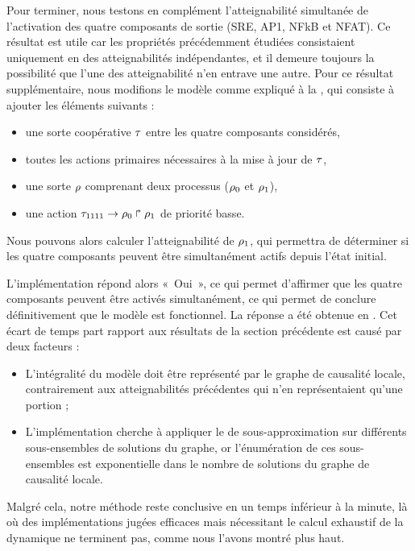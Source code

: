\myskip

Pour terminer, nous testons en complément l'atteignabilité simultanée
de l'activation des quatre composants de sortie (SRE, AP1, NFkB et NFAT).
Ce résultat est utile car les propriétés précédemment étudiées consistaient uniquement
en des atteignabilités indépendantes, et il demeure toujours la possibilité
que l'une des atteignabilité n'en entrave une autre.
Pour ce résultat supplémentaire, nous modifions le modèle comme expliqué à la
, qui consiste à ajouter les éléments suivants :
\begin{itemize}
  \item une sorte coopérative $\tau$ entre les quatre composants considérés,
  \item toutes les actions primaires nécessaires à la mise à jour de $\tau$,
  \item une sorte $\rho$ comprenant deux processus ($\rho_0$ et $\rho_1$),
  \item une action $\tau_{1111}\rightarrow\rho_0\Rsh\rho_1$ de priorité basse.
\end{itemize}
Nous pouvons alors calculer l'atteignabilité de $\rho_1$, qui permettra de déterminer
si les quatre composants peuvent être simultanément actifs depuis l'état initial.

L'implémentation répond alors «~Oui~», ce qui permet d'affirmer que les quatre composants
peuvent être activés simultanément,
ce qui permet de conclure définitivement que le modèle est fonctionnel.
La réponse a été obtenue en .
Cet écart de temps part rapport aux résultats de la section précédente est causé
par deux facteurs :
\begin{itemize}
  \item L'intégralité du modèle doit être représenté par le graphe de causalité locale,
    contrairement aux atteignabilités précédentes qui n'en représentaient qu'une portion ;
  \item L'implémentation cherche à appliquer le  de sous-approximation sur
    différents sous-ensembles de solutions du graphe, or l'énumération de ces sous-ensembles
    est exponentielle dans le nombre de solutions du graphe de causalité locale.
\end{itemize}
Malgré cela, notre méthode reste conclusive en un temps inférieur à la minute,
là où des implémentations jugées efficaces mais nécessitant le calcul
exhaustif de la dynamique ne terminent pas, comme nous l'avons montré plus haut.

